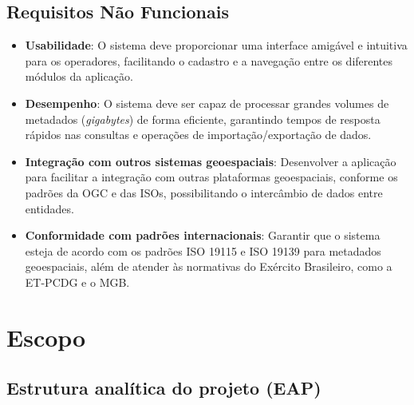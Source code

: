 \subsection{Requisitos Não Funcionais}
\begin{itemize}
    \item \textbf{Usabilidade}: O sistema deve proporcionar uma interface amigável e intuitiva para os operadores, facilitando o cadastro e a navegação entre os diferentes módulos da aplicação.
    
    \item \textbf{Desempenho}: O sistema deve ser capaz de processar grandes volumes de metadados (\textit{gigabytes}) de forma eficiente, garantindo tempos de resposta rápidos nas consultas e operações de importação/exportação de dados.

    \item \textbf{Integração com outros sistemas geoespaciais}: Desenvolver a aplicação para facilitar a integração com outras plataformas geoespaciais, conforme os padrões da OGC e das ISOs, possibilitando o intercâmbio de dados entre entidades.
    
   \item \textbf{Conformidade com padrões internacionais}: Garantir que o sistema esteja de acordo com os padrões ISO 19115 e ISO 19139 para metadados geoespaciais, além de atender às normativas do Exército Brasileiro, como a ET-PCDG e o MGB.
\end{itemize}


\newpage
\section{Escopo}

\subsection{Estrutura analítica do projeto (EAP)}


